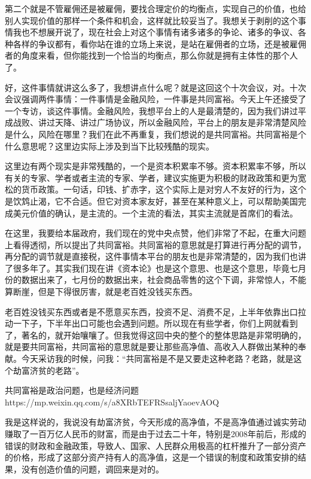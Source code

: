 \documentclass[UTF8, 12pt, a4paper]{ctexrep}
\begin{document}
第二个就是不管雇佣还是被雇佣，要找合理定价的均衡点，实现自己的价值，也给别人实现价值的那样一个条件和机会，这样就比较妥当了。我想关于剥削的这个事情我也不想展开说了，现在社会上对这个事情有诸多诸多的争论、诸多的争议、各种各样的争议都有，看你站在谁的立场上来说，是站在雇佣者的立场，还是被雇佣者的角度来看，但你能找到一个恰当的均衡点，那么你就是拥有主体性的那个人了。

好，这件事情就讲这么多了，我想讲点什么呢？就是这回这个十次会议，对。十次会议强调两件事情：一件事情是金融风险，一件事是共同富裕。今天上午还接受了一个专访，谈这件事情。金融风险，我想平台上的人是最清楚的，因为我们讲过平成战败、讲过天降、讲过广场协议，所以金融风险，平台上的朋友是非常清楚风险是什么，风险在哪里？我们在此不再重复，我们想说的是共同富裕。共同富裕是个什么意思呢？这里边实际上涉及到当下比较残酷的现实。

这里边有两个现实是非常残酷的，一个是资本积累率不够。资本积累率不够，所以有关的专家、学者或者主流的专家、学者，建议实施更为积极的财政政策和更为宽松的货币政策。一句话，印钱、扩赤字，这个实际上是对穷人不友好的行为，这个是饮鸩止渴，它不合适。但它对资本家友好，甚至在某种意义上，可以帮助美国完成美元价值的确认，是主流的。一个主流的看法，其实主流就是首席们的看法。

在这里，我要给本届政府，我们现在的党中央点赞，他们非常了不起，在重大问题上看得透彻，所以提出了共同富裕。共同富裕的意思就是打算进行再分配的调节，再分配的调节就是直接税，这件事情本平台的朋友也是非常清楚的，因为我们也讲了很多年了。其实我们现在讲《资本论》也是这个意思、也是这个意思，毕竟七月份的数据出来了，七月份的数据出来，社会商品零售的这个下调，非常惊人，不能算断崖，但是下得很厉害，就是老百姓没钱买东西。

老百姓没钱买东西或者是不愿意买东西，投资不足、消费不足，上半年依靠出口拉动一下子，下半年出口可能也会遇到问题。所以现在有些学者，你们上网就看到了，著名的，就开始嚷嚷了。但我觉得这回中央的整个的整体思路是非常明确的，就是要共同富裕，共同富裕的意思就是要让那些高净值、高收入人群做出某种的奉献。今天采访我的时候，问我：“共同富裕是不是又要走这种老路？老路，就是这个劫富济贫的老路”。

共同富裕是政治问题，也是经济问题 https://mp.weixin.qq.com/s/a8XRbTEFRSsaljYaoevAOQ

我是这样说的，我说没有劫富济贫，今天形成的高净值，不是高净值通过诚实劳动赚取了一百万亿人民币的财富，而是由于过去二十年，特别是2008年前后，形成的错误的财政和金融政策，导致人、国家、人民群众用极高的杠杆推升了一部分资产的价格，形成了这部分资产持有人的高净值，这是一个错误的制度和政策安排的结果，没有创造价值的问题，调回来是对的。
\end{document}
